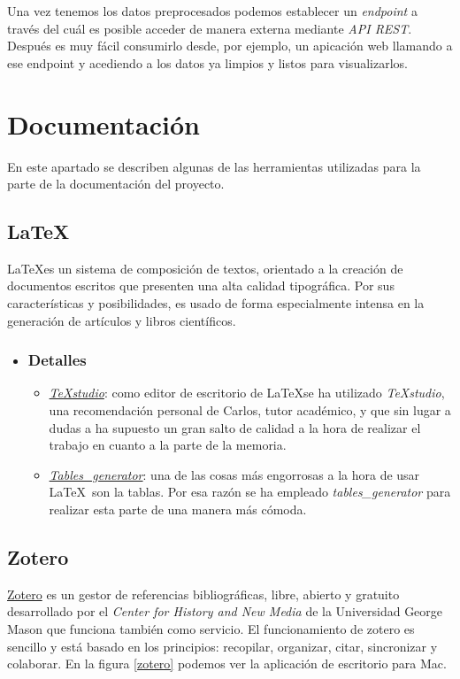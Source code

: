 Una vez tenemos los datos preprocesados podemos establecer un \textit{endpoint} a través del cuál es posible acceder de manera externa mediante \textit{API REST}. Después es muy fácil consumirlo desde, por ejemplo, un apicación web llamando a ese endpoint y acediendo a los datos ya limpios y listos para visualizarlos. 

\section{Documentación}\label{docs}
En este apartado se describen algunas de las herramientas utilizadas para la parte de la documentación del proyecto.

 \subsection{La\TeX}\label{docs_latex}
  La\TeX es un sistema de composición de textos, orientado a la creación de documentos escritos que presenten una alta calidad tipográfica. Por sus características y posibilidades, es usado de forma especialmente intensa en la generación de artículos y libros científicos. 
  
   \begin{itemize}
  	\item \subsubsection{Detalles}
  	\begin{itemize}
  		\item \href{https://www.texstudio.org}{\textit{TeXstudio}}: como editor de escritorio de La\TeX se ha utilizado \textit{TeXstudio}, una recomendación personal de Carlos, tutor académico, y que sin lugar a dudas a ha supuesto un gran salto de calidad a la hora de realizar el trabajo en cuanto a la parte de la memoria.
  		\item \href{http://www.tablesgenerator.com/latex_tables}{\textit{Tables\_generator}}: una de las cosas más engorrosas a la hora de usar La\TeX\  son la tablas. Por esa razón se ha empleado \textit{tables\_generator} para realizar esta parte de una manera más cómoda. 
  	\end{itemize}
  \end{itemize}
  
 \subsection{Zotero}\label{docs_zotero}
 \href{https://www.zotero.org/}{Zotero} es un gestor de referencias bibliográficas, libre, abierto y gratuito desarrollado por el \textit{Center for History and New Media} de la Universidad George Mason que funciona también como servicio. El funcionamiento de zotero es sencillo y está basado en los principios: recopilar, organizar, citar, sincronizar y colaborar. En la figura \ref{zotero} podemos ver la aplicación de escritorio para Mac.
  

